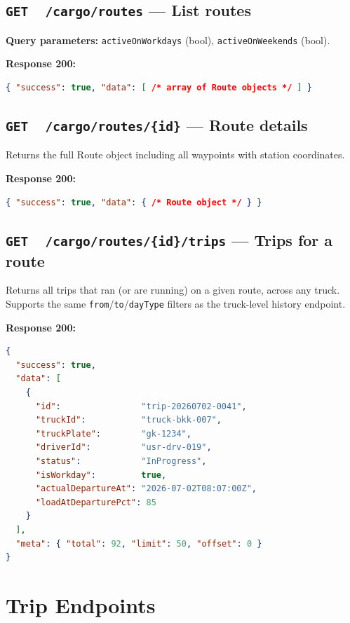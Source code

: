 \documentclass{article}
\newcommand{\GET}{\colorbox{evblue!20}{\texttt{\textbf{\color{evblue}GET}}}}
\begin{document}
\subsection{\GET\ \ \texttt{/cargo/routes} --- List routes}

\textbf{Query parameters:} \texttt{activeOnWorkdays} (bool), \texttt{activeOnWeekends} (bool).

\textbf{Response 200:}
\begin{lstlisting}[language=json]
{ "success": true, "data": [ /* array of Route objects */ ] }
\end{lstlisting}

\subsection{\GET\ \ \texttt{/cargo/routes/\{id\}} --- Route details}

Returns the full Route object including all waypoints with station coordinates.

\textbf{Response 200:}
\begin{lstlisting}[language=json]
{ "success": true, "data": { /* Route object */ } }
\end{lstlisting}

\subsection{\GET\ \ \texttt{/cargo/routes/\{id\}/trips} --- Trips for a route}

Returns all trips that ran (or are running) on a given route, across any truck.
Supports the same \texttt{from}/\texttt{to}/\texttt{dayType} filters as the
truck-level history endpoint.

\textbf{Response 200:}
\begin{lstlisting}[language=json, caption=Route trip history response]
{
  "success": true,
  "data": [
    {
      "id":                "trip-20260702-0041",
      "truckId":           "truck-bkk-007",
      "truckPlate":        "gk-1234",
      "driverId":          "usr-drv-019",
      "status":            "InProgress",
      "isWorkday":         true,
      "actualDepartureAt": "2026-07-02T08:07:00Z",
      "loadAtDeparturePct": 85
    }
  ],
  "meta": { "total": 92, "limit": 50, "offset": 0 }
}
\end{lstlisting}

\newpage

\section{Trip Endpoints}
\end{document}
